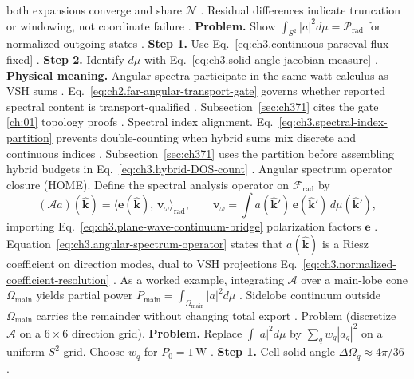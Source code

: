 both expansions converge and share \(\mathcal{N}\) \cite{hansen1988}. Residual differences
indicate truncation or windowing, not coordinate failure \cite{harrington2001}.
\textbf{Problem.} Show \(\int_{S^{2}}|a|^{2}d\mu=\mathcal{P}_{\mathrm{rad}}\) for normalized outgoing states
\cite{jackson1999}.
\textbf{Step 1.} Use Eq.~\eqref{eq:ch3.continuous-parseval-flux-fixed} \cite{hansen1988}.
\textbf{Step 2.} Identify \(d\mu\) with Eq.~\eqref{eq:ch3.solid-angle-jacobian-measure} \cite{jackson1999}.
\textbf{Physical meaning.} Angular spectra participate in the same watt calculus as VSH sums \cite{poynting1884}.
Eq.~\eqref{eq:ch2.far-angular-transport-gate} governs whether reported spectral content is transport-qualified
\cite{stratton1941}. Subsection~\ref{sec:ch371} cites the gate \ref{ch:01}
topology proofs \cite{harrington2001}.
Spectral index alignment. Eq.~\eqref{eq:ch3.spectral-index-partition} prevents double-counting when hybrid sums mix discrete and continuous
indices \cite{stratton1941}. Subsection~\ref{sec:ch371} uses the partition before assembling hybrid
budgets in Eq.~\eqref{eq:ch3.hybrid-DOS-count} \cite{hansen1988}.
Angular spectrum operator closure (HOME). Define the spectral analysis operator on \(\mathcal{F}_{\mathrm{rad}}\) by
\begin{equation}
\label{eq:ch3.angular-spectrum-operator}
(\mathcal{A}a)(\widehat{\mathbf{k}})
=
\big\langle \mathbf{e}(\widehat{\mathbf{k}}),\,\mathbf{v}_\omega\big\rangle_{\mathrm{rad}},
\qquad
\mathbf{v}_\omega=\int a(\widehat{\mathbf{k}}')\,\mathbf{e}(\widehat{\mathbf{k}}')\,d\mu(\widehat{\mathbf{k}}'),
\end{equation}
importing Eq.~\eqref{eq:ch3.plane-wave-continuum-bridge} polarization factors \(\mathbf{e}\)
\cite{jackson1999}. Equation~\eqref{eq:ch3.angular-spectrum-operator} states that
\(a(\widehat{\mathbf{k}})\) is a Riesz coefficient on direction modes, dual to VSH projections
Eq.~\eqref{eq:ch3.normalized-coefficient-resolution} \cite{harrington2001}.
As a worked example, integrating \(\mathcal{A}\) over a main-lobe cone \(\Omega_{\mathrm{main}}\) yields partial power
\(P_{\mathrm{main}}=\int_{\Omega_{\mathrm{main}}}|a|^{2}d\mu\) \cite{jackson1999}. Sidelobe
continuum outside \(\Omega_{\mathrm{main}}\) carries the remainder without changing total export
\cite{stratton1941}.
Problem (discretize \(\mathcal{A}\) on a \(6\times6\) direction grid). \textbf{Problem.} Replace \(\int|a|^{2}d\mu\) by \(\sum_{q}w_{q}|a_{q}|^{2}\) on a uniform \(S^{2}\) grid. Choose \(w_{q}\)
for \(P_{0}=1\,\mathrm{W}\) \cite{harrington2001}.
\textbf{Step 1.} Cell solid angle \(\Delta\Omega_{q}\approx4\pi/36\) \cite{jackson1999}.
